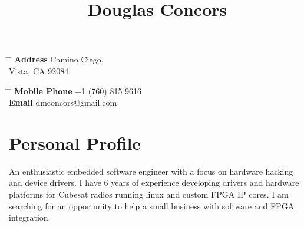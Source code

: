 \documentclass[10pt]{article} %
\begin{document}

\begin{center}
\title{Douglas Concors} %
\end{center}


\parbox{0.5\textwidth}{ %
\begin{tabbing} %
\hspace{3cm} \= \hspace{4cm} \= \kill %
{\bf Address}  Camino Ciego,\\ %
\> Vista, CA 92084 \\ %
\end{tabbing}}
\hfill %
\parbox{0.5\textwidth}{ %
\begin{tabbing} %
\hspace{3cm} \= \hspace{4cm} \= \kill %
{\bf Mobile Phone} \> +1 (760) 815 9616 \\ %
{\bf Email} \> dmconcors@gmail.com \\ %
\end{tabbing}}


\section{Personal Profile}

An enthusiastic embedded software engineer with a focus on hardware hacking and device drivers. I have 6 years of experience developing drivers and hardware platforms for Cubesat radios running linux and custom FPGA IP cores. I am searching for an opportunity to help a small business with software and FPGA integration.
\end{document}
